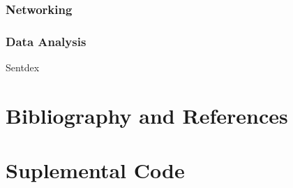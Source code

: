 \documentclass[12pt,a4paper]{book}
\begin{document}
			\subsection{Networking}
				
			\subsection{Data Analysis}
				Sentdex
	\appendix 
	\chapter{Bibliography and References} \label{chap:apdx-bib}
		\printbibliography[heading=none]
	\chapter{Suplemental Code} \label{chap:apdx-sup-code}
\end{document}
